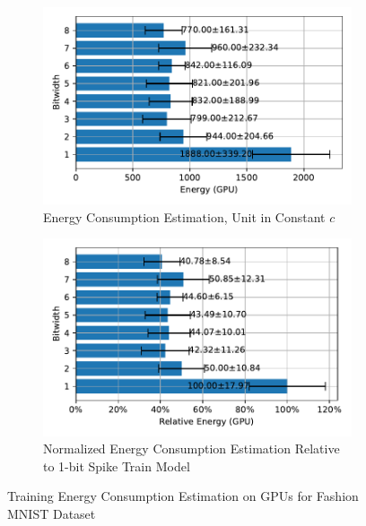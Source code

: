         \begin{figure}[H]
            \centering
            \begin{subfigure}[H]{0.495\textwidth}
                \includegraphics[width=\textwidth]{../standard/FashionMNIST/plots/fashionmnist_train_energy_gpu_horizontal.pdf}
                \caption{Energy Consumption Estimation, Unit in Constant $c$}
            \end{subfigure}
            \hfill
            \begin{subfigure}[H]{0.495\textwidth}
                \includegraphics[width=\textwidth]{../standard/FashionMNIST/plots/fashionmnist_train_relative_energy_gpu_horizontal.pdf}
                \caption{Normalized Energy Consumption Estimation Relative to 1-bit Spike Train Model}
            \end{subfigure}
            \caption{Training Energy Consumption Estimation on GPUs for Fashion MNIST Dataset}
        \end{figure}

